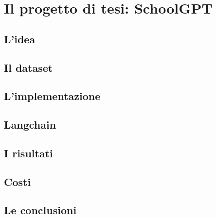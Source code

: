 \chapter{Il progetto di tesi: SchoolGPT}
\section{L'idea}

\section{Il dataset}

\section{L'implementazione}

\section{Langchain}

\section{I risultati}
\section{Costi}
\section{Le conclusioni}